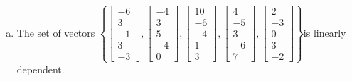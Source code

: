 \begin{exerciseAnswer}
\begin{enumerate}[(a)]
\item  The set of vectors \( \left\{ \left[\begin{array}{c}
-6 \\
3 \\
-1 \\
3 \\
-3
\end{array}\right] , \left[\begin{array}{c}
-4 \\
3 \\
5 \\
-4 \\
0
\end{array}\right] , \left[\begin{array}{c}
10 \\
-6 \\
-4 \\
1 \\
3
\end{array}\right] , \left[\begin{array}{c}
4 \\
-5 \\
3 \\
-6 \\
7
\end{array}\right] , \left[\begin{array}{c}
2 \\
-3 \\
0 \\
3 \\
-2
\end{array}\right] \right\} \)is linearly dependent.
\end{enumerate}
    
\end{exerciseAnswer}
    
